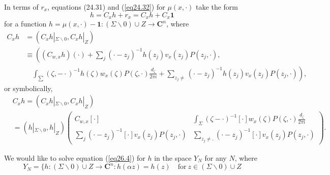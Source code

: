 \documentclass{surv-l}
\theoremstyle{plain}
\theoremstyle{definition}
\numberwithin{equation}{chapter}
\begin{document}
In terms of $r_{x}$, equations (24.31) and (\ref{eq24.32}) for $\mu(x, \cdot)$ take the form
\begin{equation}\label{eq26.4}
h=C_{x}h+r_{x}=C_{x}h+C_{x}\mathbf{1}
\end{equation}
for a function $h=\mu(x, \cdot)-\mathbf{1}:(\Sigma\backslash 0)\cup Z\rightarrow \mathbf{C}^{n}$, where
\begin{align}
C_{x}h &=(C_{x}h|_{\Sigma\backslash 0},C_{x}h|_{Z})\\\nonumber
&\equiv \left((C_{w, x}h)(\cdot)+\sum_{j}(\cdot-z_{j})^{-1}h(z_{j})v_{x}(z_{j})P(z_{j},\cdot),\right.\\\nonumber
&\quad\left.\int_{\sum}(\zeta, -\cdot)^{-1}h(\zeta)w_{x}(\zeta)P(\zeta, \cdot)\frac{d_{\zeta}}{2\pi i}+\sum_{z_{j}\neq}(\cdot-z_{j})^{-1}h(z_{j})v_{x}(z_{j})P(z_{j},\cdot)\right),
\end{align}
or symbolically,
\begin{align}\label{eq26.6}
&C_{x}h  =(C_{x}h|_{\Sigma\backslash 0},C_{x}h|_{Z})\\ \nonumber
&=(h|_{\Sigma\backslash 0}, h|_{Z})  \left(\begin{array}{cc}
C_{w,x}[\cdot] & \int_{\Sigma}(\zeta-\cdot)^{-1}[\cdot]w_{x}(\zeta)P(\zeta, \cdot)\frac{d_{\zeta}}{2{\pi i}}\\\nonumber
\sum_{j}(\cdot-z_{j})^{-1}[\cdot]v_{x}(z_{j})P(z_{j},\cdot) & \sum_{z_{j}\neq.}(\cdot-z_{j})^{-1}[\cdot]v_{x}(z_{j})P(z_{j},\cdot)
\end{array}\right).
\end{align}


We would like to solve equation (\ref{eq26.4}) for $h$ in the space $Y_{N}$ for any $N$, where
\begin{equation}\label{eq26.7}
Y_{N}=\{h:(\Sigma\backslash 0)\cup Z\rightarrow \mathbf{C}^{n}:h(\alpha z)=h(z)\quad \mathrm{for}\ z\in(\Sigma\backslash 0)\cup Z
\end{equation}
\end{document}
